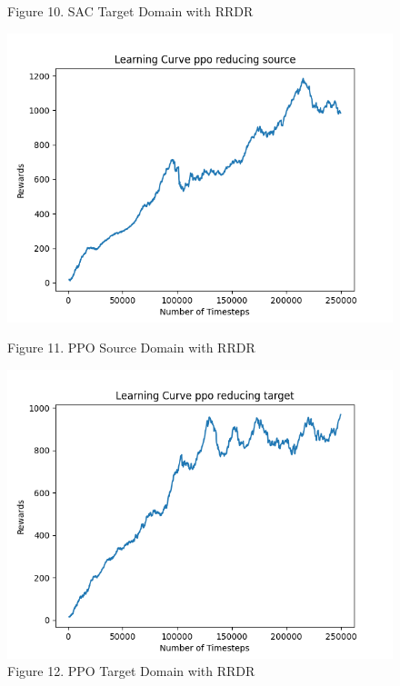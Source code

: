 \documentclass[12pt]{article}
\begin{document}
\begin{figure}[H]
\begin{minipage}{0.45\textwidth}
        \caption{Figure 10. SAC Target Domain with RRDR}
        \label{fig:sac_target_rrdr}
    \end{minipage}
    \vfill
    \begin{minipage}{0.45\textwidth}
        \centering
        \includegraphics[width=\textwidth]{../images/Learning_curve_PPO_reducing_Source.png}
        \caption{Figure 11. PPO Source Domain with RRDR}
        \label{fig:ppo_source_rrdr}
    \end{minipage}
    \hfill
    \begin{minipage}{0.45\textwidth}
        \centering
        \includegraphics[width=\textwidth]{../images/Learning_curve_PPO_reducing_Target.png}
        \caption{Figure 12. PPO Target Domain with RRDR}
        \label{fig:ppo_target_rrdr}
    \end{minipage}

\end{figure}
\end{document}
